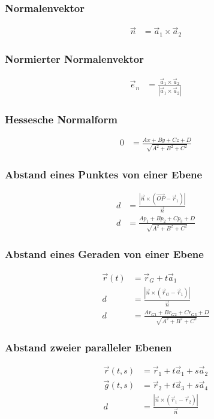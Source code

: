 \begin{multicols}{2}
\subsubsection*{Normalenvektor}
\begin{align*} 
\vec{n}&=\vec{a}_1\times\vec{a}_2
\end{align*}
\vfill
\subsubsection*{Normierter Normalenvektor}
\begin{align*} 
\vec{e}_n&=\frac{\vec{a}_1\times\vec{a}_2}{|\vec{a}_1\times\vec{a}_2|}
\end{align*}
\vfill
\end{multicols}

\begin{multicols}{2}
\subsubsection*{Hessesche Normalform}
\begin{align*} 
0&=\frac{Ax+By+Cz+D}{\sqrt{A^2+B^2+C^2}}
\end{align*}
\vfill
\subsubsection*{Abstand eines Punktes von einer Ebene}
\begin{align*} 
d&=\frac{|\vec{n}\times\left(\vec{OP}-\vec{r}_1\right)|}{\vec{n}}\\
d&=\frac{Ap_1+Bp_2+Cp_3+D}{\sqrt{A^2+B^2+C^2}}
\end{align*}
\vfill
\end{multicols}

\begin{multicols}{2}
\subsubsection*{Abstand eines Geraden von einer Ebene}
\begin{align*} 
\vec{r}(t) &=\vec{r}_G+t\vec{a}_1\\
d&=\frac{|\vec{n}\times\left(\vec{r}_G-\vec{r}_1\right)|}{\vec{n}}\\
d&=\frac{Ar_{G1}+Br_{G2}+Cr_{G3}+D}{\sqrt{A^2+B^2+C^2}}
\end{align*}
\vfill
\subsubsection*{Abstand zweier paralleler Ebenen}
\begin{align*} 
\vec{r}(t,s) &=\vec{r}_1+t\vec{a}_1+s\vec{a}_2\\
\vec{g}(t,s) &=\vec{r}_2+t\vec{a}_3+s\vec{a}_4\\
d&=\frac{|\vec{n}\times\left(\vec{r}_1-\vec{r}_2\right)|}{\vec{n}}
\end{align*}
\vfill
\end{multicols}

